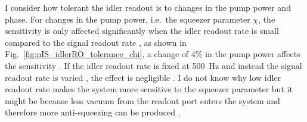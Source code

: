 I consider how tolerant the idler readout is to changes in the pump power and phase. 
For changes in the pump power, i.e.\ the squeezer parameter $\chi$, the sensitivity is only affected significantly when the idler readout rate is small compared to the signal readout rate , as shown in Fig.~\ref{fig:nIS_idlerRO_tolerance_chi}, a change of $4\%$ in the pump power  affects the sensitivity .  If the idler readout rate is fixed at 500~Hz and instead the signal readout rate is varied , the effect is negligible . I do not know why low idler readout rate makes the system more sensitive to the squeezer parameter but it might be because less vacuum from the readout port enters the system and therefore more anti-squeezing can be produced .

